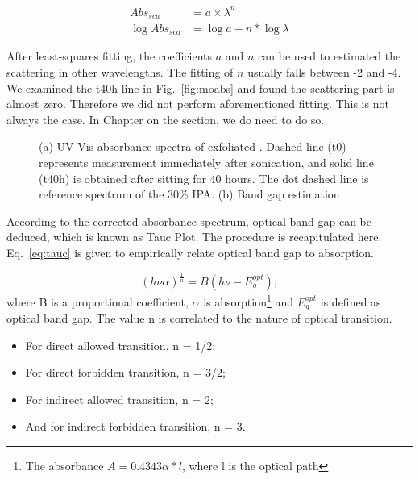 \begin{align}
Abs_{sca}  & = a\times \lambda^{n}  \label{eq:sca1}\\
\log{Abs_{sca}} & = \log{a} + n*\log{\lambda} \label{eq:sca2}
\end{align}

After least-squares fitting, the coefficients $a$ and $n$ can be used to estimated the scattering in other wavelengths. The fitting of $n$ usually falls between -2 and -4. We examined the t40h line in Fig.~\ref{fig:moabs} and found the scattering part is almost zero. Therefore we did not perform aforementioned fitting. This is not always the case. In Chapter on the  section, we do need to do so.

\begin{figure}[htb]
\centering
{}\hspace{0.04\textwidth}
\caption[UV-Vis spectra of exfoliated ]{(a) UV-Vis absorbance spectra of exfoliated . Dashed line (t0) represents measurement immediately after sonication, and solid line (t40h) is obtained after sitting for 40 hours. The dot dashed line is reference spectrum of the 30\% IPA. (b) Band gap estimation}
\label{fig:mouv}
\end{figure}

According to the corrected absorbance spectrum, optical band gap can be deduced, which is known as Tauc Plot.\cite{Tauc1972} The procedure is recapitulated here. Eq.~\ref{eq:tauc} is given to empirically relate optical band gap to absorption.

\begin{equation}\label{eq:tauc}
 (h\nu \alpha)^{\frac{1}{n}} = B(h\nu - E_g^{opt}),
\end{equation}
where B is a proportional coefficient, $\alpha$ is absorption\footnote{The absorbance $A = 0.4343\alpha*l$, where l is the optical path} and $E_g^{opt}$ is defined as optical band gap. The value n is correlated to the nature of optical transition.
\begin{itemize}
\item For direct allowed transition, n = 1/2;
\item For direct forbidden transition, n = 3/2;
\item For indirect allowed transition, n = 2;
\item And for indirect forbidden transition, n = 3.
\end{itemize}

